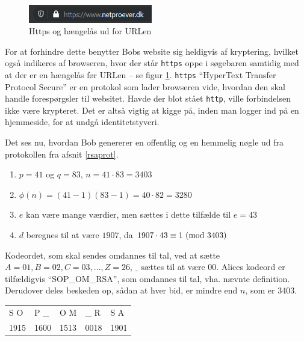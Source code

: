 \begin{figure}
    \vspace{-30pt}
    \begin{center}
        \includegraphics[width=0.48\textwidth]{img/secure.png}
    \end{center}
    \vspace{-20pt}
    \caption{Https og hængelås ud for URLen}
    \label{sikker}
    \vspace{-10pt}
\end{figure}

For at forhindre dette benytter Bobs website sig heldigvis af kryptering, hvilket også indikeres af browseren, hvor der står \texttt{https} oppe i søgebaren samtidig med at der er en hængelås før URLen -- se figur \ref{sikker}.
\texttt{https} ``HyperText Transfer Protocol Secure'' er en protokol som lader browseren vide, hvordan den skal handle forespørgsler til websitet. \cite{https} Havde der blot stået \texttt{http}, ville forbindelsen ikke være krypteret. Det er altså vigtig at kigge på, inden man logger ind på en hjemmeside, for at undgå identitetstyveri.
\par
Det ses nu, hvordan Bob genererer en offentlig og en hemmelig nøgle ud fra protokollen fra afsnit \ref{rsaprot}.

\begin{enumerate}[label*=(\arabic*)]%
    \item \(p = 41\) og \(q = 83\), \(n = 41 \cdot 83 = 3403\)
    \item \(\phi(n) = (41 - 1) (83 - 1) = 40 \cdot 82 = 3280\)
    \item \(e\) kan være mange værdier, men sættes i dette tilfælde til \(e = 43\)
    \item \(d\) beregnes til at være \(1907\), da \(1907 \cdot 43 \equiv 1 \ (\mathrm{mod}\ 3403)\)
\end{enumerate}

Kodeordet, som skal sendes omdannes til tal, ved at sætte \(A=01, B=02, C=03, \hdots , Z=26\), \(\_\) sættes til at være 00.
Alices kodeord er tilfældigvis ``SOP\_OM\_RSA'', som omdannes til tal, vha. nævnte definition.
Derudover deles beskeden op, sådan at hver bid, er mindre end \(n\), som er 3403.
\begin{center}
    \begin{tabular}{l l l l l}
        S O  & P \_  & O M  & \_ R  & S A\\
        1915 & 1600  & 1513  & 0018   & 1901\\
    \end{tabular}
\end{center}


